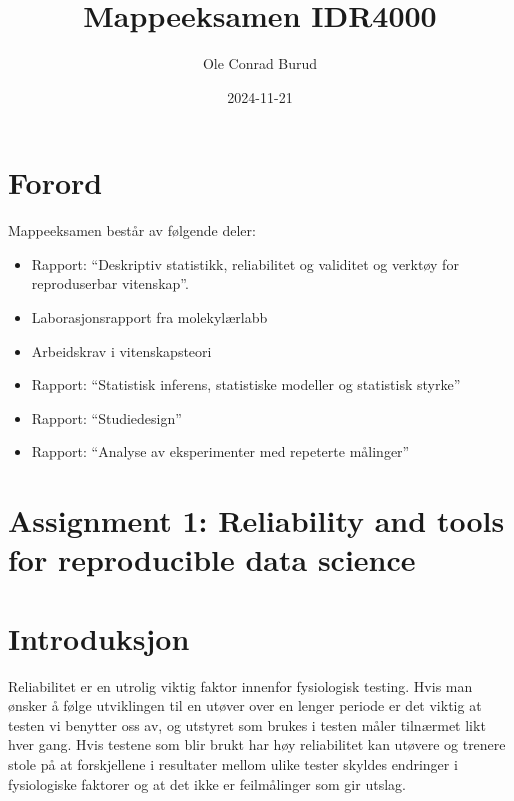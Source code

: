 \documentclass[
  letterpaper,
  DIV=11,
  numbers=noendperiod]{scrreprt}
\title{Mappeeksamen IDR4000}
\author{Ole Conrad Burud}
\date{2024-11-21}
\providecommand{\tightlist}{%
  \setlength{\itemsep}{0pt}\setlength{\parskip}{0pt}}\usepackage{longtable,booktabs,array}
\renewcommand*\contentsname{Table of contents}
\newcommand\contentsname{Table of contents}
\begin{document}
\maketitle

\renewcommand*\contentsname{Table of contents}
{
\hypersetup{linkcolor=}
\setcounter{tocdepth}{2}
\tableofcontents
}


\chapter*{Forord}\label{forord}


Mappeeksamen består av følgende deler:

\begin{itemize}
\tightlist
\item
  Rapport: ``Deskriptiv statistikk, reliabilitet og validitet og verktøy
  for reproduserbar vitenskap''.
\item
  Laborasjonsrapport fra molekylærlabb
\item
  Arbeidskrav i vitenskapsteori
\item
  Rapport: ``Statistisk inferens, statistiske modeller og statistisk
  styrke''
\item
  Rapport: ``Studiedesign''
\item
  Rapport: ``Analyse av eksperimenter med repeterte målinger''
\end{itemize}


\chapter{Assignment 1: Reliability and tools for reproducible data
science}\label{assignment-1-reliability-and-tools-for-reproducible-data-science}


\chapter{Introduksjon}\label{introduksjon}

Reliabilitet er en utrolig viktig faktor innenfor fysiologisk testing.
Hvis man ønsker å følge utviklingen til en utøver over en lenger periode
er det viktig at testen vi benytter oss av, og utstyret som brukes i
testen måler tilnærmet likt hver gang. Hvis testene som blir brukt har
høy reliabilitet kan utøvere og trenere stole på at forskjellene i
resultater mellom ulike tester skyldes endringer i fysiologiske faktorer
og at det ikke er feilmålinger som gir utslag.
\end{document}
